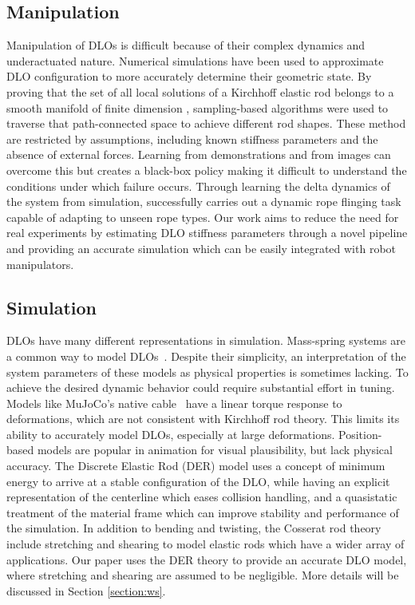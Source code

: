 \documentclass[letterpaper, 10 pt, conference]{ieeeconf}  %
\begin{document}
\subsection{Manipulation}
Manipulation of DLOs is difficult because of their complex dynamics and underactuated nature. Numerical simulations have been used to approximate DLO configuration \cite{lamiraux2001planning,moll2006path} to more accurately determine their geometric state. By proving that the set of all local solutions of a Kirchhoff elastic rod belongs to a smooth manifold of finite dimension \cite{bretl2014quasi}, sampling-based algorithms were used to traverse that path-connected space \cite{borum2015free} to achieve different rod shapes. These method are restricted by assumptions, including known stiffness parameters and the absence of external forces. Learning from demonstrations \cite{nair2017combining} and from images \cite{wang2019learning,zhang2021robots} can overcome this but creates a black-box policy making it difficult to understand the conditions under which failure occurs. Through learning the delta dynamics of the system from simulation, \cite{chi2022iterative} successfully carries out a dynamic rope flinging task capable of adapting to unseen rope types. Our work aims to reduce the need for real experiments by estimating DLO stiffness parameters through a novel pipeline and providing an accurate simulation which can be easily integrated with robot manipulators.

\subsection{Simulation}
DLOs have many different representations in simulation. Mass-spring systems are a common way to model DLOs~\cite{lloyd2007identification}. Despite their simplicity, an interpretation of the system parameters of these models as physical properties is sometimes lacking. To achieve the desired dynamic behavior could require substantial effort in tuning. Models like MuJoCo's native cable~\cite{todorov2012mujoco} have a linear torque response to deformations, which are not consistent with Kirchhoff rod theory. This limits its ability to accurately model DLOs, especially at large deformations. Position-based models \cite{umetani2014position} are popular in animation for visual plausibility, but lack physical accuracy. The Discrete Elastic Rod (DER) model \cite{bergou2008discrete} uses a concept of minimum energy to arrive at a stable configuration of the DLO, while having an explicit representation of the centerline which eases collision handling, and a quasistatic treatment of the material frame which can improve stability and performance of the simulation. In addition to bending and twisting, the Cosserat rod theory \cite{cosserat1909theorie,spillmann2007corde} include stretching and shearing to model elastic rods which have a wider array of applications. Our paper uses the DER theory to provide an accurate DLO model, where stretching and shearing are assumed to be negligible. More details will be discussed in Section \ref{section:ws}.
\end{document}
